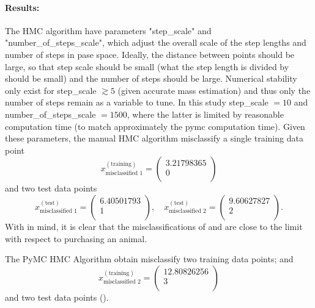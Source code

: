\begin{example}
	\paragraph{Results: } The HMC algorithm have parameters "step\_scale" and "number\_of\_steps\_scale", which adjust the overall scale of the step lengths and number of steps in pase space. Ideally, the distance between points should be large, so that step scale should be small (what the step length is divided by should be small) and the number of steps should be large. Numerical stability only exist for step\_scale $\gtrsim 5$ (given accurate mass estimation) and thus only the number of steps remain as a variable to tune. In this study step\_scale $=10$ and number\_of\_steps\_scale $=1500$, where the latter is limited by reasonable computation time (to match approximately the pymc computation time). Given these parameters, the manual HMC algorithm misclassify a single training data point
	\begin{equation}
		x^{(\text{training})}_{\text{misclassified 1}} = \begin{pmatrix}
			3.21798365\\ 0\\
		\end{pmatrix}
		\label{eq:misclassified1_training}
	\end{equation}
	and two test data points
	\begin{equation}
		x^{(\text{test})}_{\text{misclassified 1}} = \begin{pmatrix}
			6.40501793\\ 1\\
		\end{pmatrix}, \quad x^{(\text{test})}_{\text{misclassified 2}} = \begin{pmatrix}
			9.60627827\\ 2\\
		\end{pmatrix}.
		\label{eq:misclassified1_test}
	\end{equation}
	With  in mind, it is clear that the misclassifications of  and  are close to the limit with respect to purchasing an animal.  
	
	
	The PyMC HMC Algorithm obtain misclassify two training data points;  and 
	\begin{equation}
		x^{(\text{training})}_{\text{misclassified 2}} = \begin{pmatrix}
			12.80826256\\ 3\\
		\end{pmatrix}
		\label{eq:misclassified1_training2}
	\end{equation}
	and two test data points ().
	

\end{example}

